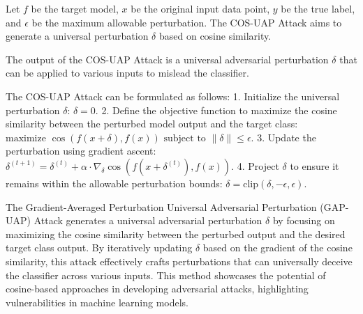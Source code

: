 Let \( f \) be the target model, \( x \) be the original input data point, \( y \) be the true label, and \( \epsilon \) be the maximum allowable perturbation. The COS-UAP Attack aims to generate a universal perturbation \( \delta \) based on cosine similarity.

The output of the COS-UAP Attack is a universal adversarial perturbation \( \delta \) that can be applied to various inputs to mislead the classifier.

The COS-UAP Attack can be formulated as follows:
1. Initialize the universal perturbation \( \delta \):
   $
   \delta = 0.
   $
2. Define the objective function to maximize the cosine similarity between the perturbed model output and the target class:
   $
   \text{maximize } \cos(f(x + \delta), f(x)) \text{ subject to } \|\delta\| \leq \epsilon.
   $
3. Update the perturbation using gradient ascent:
   $
   \delta^{(t+1)} = \delta^{(t)} + \alpha \cdot \nabla_{\delta} \cos(f(x + \delta^{(t)}), f(x)).
   $
4. Project \( \delta \) to ensure it remains within the allowable perturbation bounds:
   $
   \delta = \text{clip}(\delta, -\epsilon, \epsilon).
   $

The Gradient-Averaged Perturbation Universal Adversarial Perturbation (GAP-UAP) Attack generates a universal adversarial perturbation \( \delta \) by focusing on maximizing the cosine similarity between the perturbed output and the desired target class output. By iteratively updating \( \delta \) based on the gradient of the cosine similarity, this attack effectively crafts perturbations that can universally deceive the classifier across various inputs. This method showcases the potential of cosine-based approaches in developing adversarial attacks, highlighting vulnerabilities in machine learning models.
